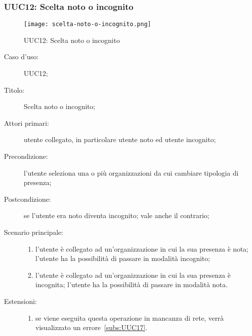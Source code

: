 \documentclass[../../../analisi-dei-requisiti.tex]{subfiles}
\begin{document}
\subsubsection{UUC12: Scelta noto o incognito}%
\label{subs:UUC12}

\begin{figure}[H]
  \centering
  \texttt{[image: scelta-noto-o-incognito.png]}
  \caption{UUC12: Scelta noto o incognito}%
  \label{fig:UUC12}
\end{figure}

\begin{description}
  \item[Caso d'uso:] UUC12;
  \item[Titolo:] Scelta noto o incognito;
  \item[Attori primari:] utente collegato, in particolare utente noto ed utente incognito;
  \item[Precondizione:] l'utente seleziona una o più organizzazioni da cui cambiare tipologia di presenza;
  \item[Postcondizione:] se l'utente era noto diventa incognito; vale anche il contrario;
  \item[Scenario principale:]
        \begin{enumerate}
          \item l'utente è collegato ad un'organizzazione in cui la sua presenza è nota; l'utente ha la possibilità di passare in modalità incognito;
          \item l'utente è collegato ad un'organizzazione in cui la sua presenza è incognita; l'utente ha la possibilità di passare in modalità nota.
        \end{enumerate}
  \item[Estensioni:]
        \begin{enumerate}
          \item se viene eseguita questa operazione in mancanza di rete, verrà visualizzato un errore~\ref{subs:UUC17}.
        \end{enumerate}
\end{description}
\end{document}
